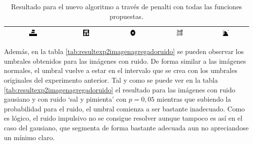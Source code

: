 \begin{table}
\centering
\begin{tabular}{ccccc}\hline
\includegraphics[width=0.15\textwidth]{img/res/e2a/alg1agregate-chair.jpg} &
\includegraphics[width=0.15\textwidth]{img/res/e2a/alg1agregate-block.jpg} &
\includegraphics[width=0.15\textwidth]{img/res/e2a/alg1agregate-02.jpg} &
\includegraphics[width=0.15\textwidth]{img/res/e2a/alg1agregate-09.jpg} &
\includegraphics[width=0.15\textwidth]{img/res/e2a/alg1agregate-07.jpg}\\\hline
\end{tabular}
\caption{Resultado para el nuevo algoritmo a través de penalti con todas las funciones propuestas.\label{tab:resultexp2imagenagregado}}
\end{table}

Además, en la tabla \ref{tab:resultexp2imagenagregadoruido} se pueden observar los umbrales obtenidos para las imágenes con ruido. De forma similar a las imágenes normales, el umbral vuelve a estar en el intervalo que se crea con los umbrales originales del experimento anterior. Tal y como se puede ver en la tabla \ref{tab:resultexp2imagenagregadoruido} el resultado para las imágenes con ruido gausiano y con ruido `sal y pimienta' con $p=0,05$ mientras que subiendo la probabilidad para el ruido, el umbral comienza a ser bastante inadecuado. Como es lógico, el ruido impulsivo no se consigue resolver aunque tampoco es así en el caso del gausiano, que segmenta de forma bastante adecuada aun no apreciandose un mínimo claro.

